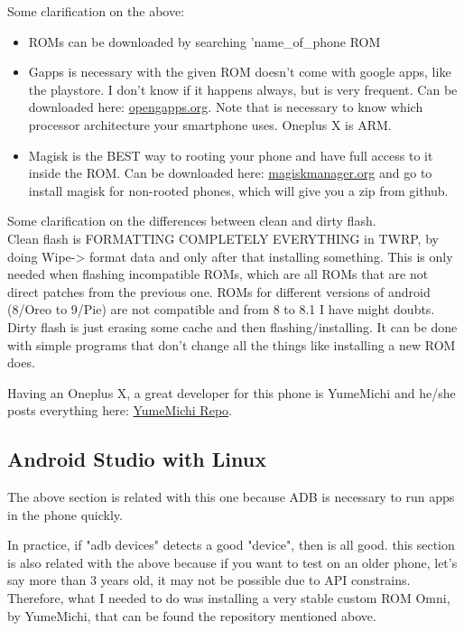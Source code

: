 \vspace{.4cm}
\par Some clarification on the above:
\begin{itemize}
    \item ROMs can be downloaded by searching 'name\_of\_phone ROM
    \item Gapps is necessary with the given ROM doesn't come with google apps, like the playstore. I don't know if it happens always, but is very frequent. Can be downloaded here: \href{https://opengapps.org/}{opengapps.org}. Note that is necessary to know which processor architecture your smartphone uses. Oneplus X is ARM.
    \item Magisk is the BEST way to rooting your phone and have full access to it inside the ROM. Can be downloaded here: \href{https://magiskmanager.com/#How_to_Download_Magisk_Manager_Latest_Version_711_For_Android_2019_Method_1}{magiskmanager.org} and go to install magisk for non-rooted phones, which will give you a zip from github. 
\end{itemize}

\vspace{.4cm}

\par Some clarification on the differences between clean and dirty flash. \\
Clean flash is FORMATTING COMPLETELY EVERYTHING in TWRP, by doing Wipe-> format data and only after that installing something. This is only needed when flashing incompatible ROMs, which are all ROMs that are not direct patches from the previous one. ROMs for different versions of android (8/Oreo to 9/Pie) are not compatible and from 8 to 8.1 I have might doubts.
Dirty flash is just erasing some cache and then flashing/installing. It can be done with simple programs that don't change all the things like installing a new ROM does. 

\vspace{.4cm}

\par Having an Oneplus X, a great developer for this phone is YumeMichi and he/she posts everything here: \href{https://basketbuild.com/devs/YumeMichi}{YumeMichi Repo}. 





\subsection{Android Studio with Linux}
\par The above section is related with this one because ADB is necessary to run apps in the phone quickly.
\par In practice, if "adb devices" detects a good "device", then is all good. this section is also related with the above because if you want to test on an older phone, let's say more than 3 years old, it may not be possible due to API constrains. Therefore, what I needed to do was installing a very stable custom ROM Omni, by YumeMichi, that can be found the repository mentioned above.

